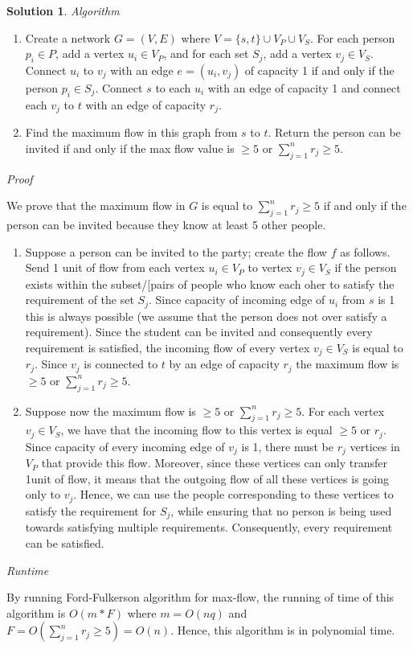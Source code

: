 \documentclass{article}
\theoremstyle{definition}
\newtheorem*{solution*}{Solution}
\newenvironment{solution}{\begin{solution*}}{{} \end{solution*}}
\begin{document}
	\medskip
		\begin{solution}
		\emph{Algorithm}
		\begin{enumerate}
			\item Create a network $G=(V, E)$ where $V = \{s, t\} \cup V_P \cup V_S$. For each person $p_i \in P$, add a vertex $u_i \in V_P$, and for each set $S_j$, add a vertex $v_j \in V_S$. Connect $u_i$ to $v_j$ with an edge $e = (u_i, v_j)$ of capacity 1 if and only if the person $p_i \in S_j$. Connect $s$ to each $u_i$ with an edge of capacity 1 and connect each $v_j$ to $t$ with an edge of capacity $r_j$.
			\item Find the maximum flow in this graph from $s$ to $t$. Return the person can be invited if and only if the max flow value is $ \geq 5$ or $\sum_{j=1}^{n} r_j \geq 5$.
		\end{enumerate}

		\item \emph{Proof}
		\item We prove that the maximum flow in $G$ is equal to $\sum_{j=1}^{n} r_j \geq 5$ if and only if the person can be invited because they know at least 5 other people.
		\begin{enumerate}
			\item Suppose a person can be invited to the party; create the flow $f$ as follows. Send 1 unit of flow from each vertex $u_i \in V_P$ to vertex $v_j \in V_S$ if the person exists within the subset/[pairs of people who know each oher to satisfy the requirement of the set $S_j$. Since capacity of incoming edge of $u_i$ from $s$ is 1 this is always possible (we assume that the person does not over satisfy a requirement). Since the student can be invited and consequently every requirement is satisfied, the incoming flow of every vertex $v_j \in V_S$ is equal to $r_j$. Since $v_j$ is connected to $t$ by an edge of capacity $r_j$ the maximum flow is $ \geq 5$ or $\sum_{j=1}^{n} r_j \geq 5$.
			\item Suppose now  the maximum flow is $ \geq 5$ or $\sum_{j=1}^{n} r_j \geq 5$. For each vertex $v_j \in V_S$, we have that the incoming  flow to this vertex is equal $ \geq 5$ or $r_j$. Since capacity of every incoming edge of $v_j$ is 1, there must be $r_j$ vertices in $V_P$ that provide this flow.  Moreover, since these vertices can only transfer 1unit of flow, it means that the outgoing flow of all these vertices is going only to $v_j$.  Hence, we can use the people corresponding to these vertices to satisfy the requirement for $S_j$, while ensuring that no person is being used towards satisfying multiple requirements.  Consequently, every requirement can be satisfied.
		\end{enumerate}
		
		\item \emph{Runtime}
		\item By running Ford-Fulkerson algorithm for max-flow, the running of time of this algorithm is $O(m*F)$ where $m=O(nq)$ and $F=O(\sum_{j=1}^{n} r_j \geq 5) = O(n)$. Hence, this algorithm is in polynomial time. 
		\end{solution}
		
\end{document}
